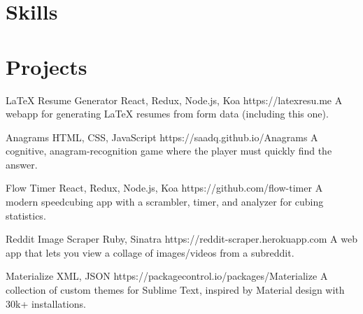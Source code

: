 \documentclass[a4paper]{friggeri-cv}
\begin{document}
\section{Skills}
\begin{entrylist}
\end{entrylist}


\section{Projects}
\begin{entrylist}
\entry
    {}
    {LaTeX Resume Generator {\normalfont React, Redux, Node.js, Koa}}
    {https://latexresu.me}
    {A webapp for generating LaTeX resumes from form data (including this one).}

\entry
    {}
    {Anagrams {\normalfont HTML, CSS, JavaScript}}
    {https://saadq.github.io/Anagrams}
    {A cognitive, anagram-recognition game where the player must quickly find the answer.}

\entry
    {}
    {Flow Timer {\normalfont React, Redux, Node.js, Koa}}
    {https://github.com/flow-timer}
    {A modern speedcubing app with a scrambler, timer, and analyzer for cubing statistics.}

\entry
    {}
    {Reddit Image Scraper {\normalfont Ruby, Sinatra}}
    {https://reddit-scraper.herokuapp.com}
    {A web app that lets you view a collage of images/videos from a subreddit.}

\entry
    {}
    {Materialize {\normalfont XML, JSON}}
    {https://packagecontrol.io/packages/Materialize}
    {A collection of custom themes for Sublime Text, inspired by Material design with 30k+ installations.}

\end{entrylist}
\end{document}
